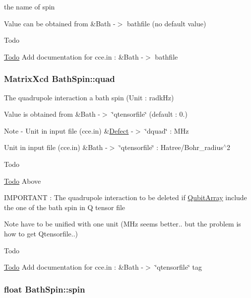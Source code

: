 the name of spin 

Value can be obtained from \&Bath -\/$>$ bathfile (no default value) \begin{DoxyRefDesc}{Todo}
\item[\hyperlink{todo__todo000001}{Todo}]Add documentation for cce.\-in \-: \&Bath -\/$>$ bathfile \end{DoxyRefDesc}
\hypertarget{structBathSpin_a304f556a5ba51a1275171e40d212d0d2}{
\subsubsection[{quad}]{\setlength{\rightskip}{0pt plus 5cm}Matrix\-Xcd Bath\-Spin\-::quad}}\label{structBathSpin_a304f556a5ba51a1275171e40d212d0d2}


The quadrupole interaction a bath spin (Unit \-: radk\-Hz) 

Value is obtained from \&Bath -\/$>$ \char`\"{}qtensorfile\char`\"{} (default \-: 0.) \begin{DoxyNote}{Note}
-\/ Unit in input file (cce.\-in) \&\hyperlink{structDefect}{Defect} -\/$>$ \char`\"{}dquad\char`\"{} \-: M\-Hz
\begin{DoxyItemize}
\item Unit in input file (cce.\-in) \&Bath -\/$>$ \char`\"{}qtensorfile\char`\"{} \-: Hatree/\-Bohr\-\_\-radius$^\wedge$2 
\end{DoxyItemize}
\end{DoxyNote}
\begin{DoxyRefDesc}{Todo}
\item[\hyperlink{todo__todo000009}{Todo}]Above 

I\-M\-P\-O\-R\-T\-A\-N\-T \-: The quadrupole interaction to be deleted if \hyperlink{structQubitArray}{Qubit\-Array} include the one of the bath spin in Q tensor file \end{DoxyRefDesc}
\begin{DoxyNote}{Note}
have to be unified with one unit (M\-Hz seems better.. but the problem is how to get Qtensorfile..) 
\end{DoxyNote}
\begin{DoxyRefDesc}{Todo}
\item[\hyperlink{todo__todo000010}{Todo}]Add documentation for cce.\-in \-: \&Bath -\/$>$ \char`\"{}qtensorfile\char`\"{} tag \end{DoxyRefDesc}
\hypertarget{structBathSpin_a0738a356e1f78530032d8bc8de02fbd8}{
\subsubsection[{spin}]{\setlength{\rightskip}{0pt plus 5cm}float Bath\-Spin\-::spin}}\label{structBathSpin_a0738a356e1f78530032d8bc8de02fbd8}


